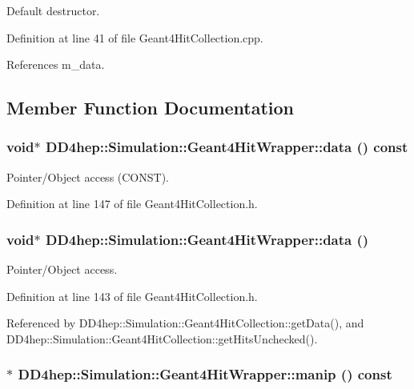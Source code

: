 Default destructor. 

Definition at line 41 of file Geant4HitCollection.cpp.

References m\_\-data.

\subsection{Member Function Documentation}
\hypertarget{class_d_d4hep_1_1_simulation_1_1_geant4_hit_wrapper_a07f376a52c5648d4b0efd63d113c5c03}{
\subsubsection[{data}]{\setlength{\rightskip}{0pt plus 5cm}void$\ast$ DD4hep::Simulation::Geant4HitWrapper::data () const}}
\label{class_d_d4hep_1_1_simulation_1_1_geant4_hit_wrapper_a07f376a52c5648d4b0efd63d113c5c03}


Pointer/Object access (CONST). 

Definition at line 147 of file Geant4HitCollection.h.\hypertarget{class_d_d4hep_1_1_simulation_1_1_geant4_hit_wrapper_af7b7738a7307f1f9372dc37efc319dc6}{
\subsubsection[{data}]{\setlength{\rightskip}{0pt plus 5cm}void$\ast$ DD4hep::Simulation::Geant4HitWrapper::data ()}}
\label{class_d_d4hep_1_1_simulation_1_1_geant4_hit_wrapper_af7b7738a7307f1f9372dc37efc319dc6}


Pointer/Object access. 

Definition at line 143 of file Geant4HitCollection.h.

Referenced by DD4hep::Simulation::Geant4HitCollection::getData(), and DD4hep::Simulation::Geant4HitCollection::getHitsUnchecked().\hypertarget{class_d_d4hep_1_1_simulation_1_1_geant4_hit_wrapper_a7d21c352f12b3a7c0dedc895a270caf1}{
\subsubsection[{manip}]{$\ast$ DD4hep::Simulation::Geant4HitWrapper::manip () const}}
\label{class_d_d4hep_1_1_simulation_1_1_geant4_hit_wrapper_a7d21c352f12b3a7c0dedc895a270caf1}


